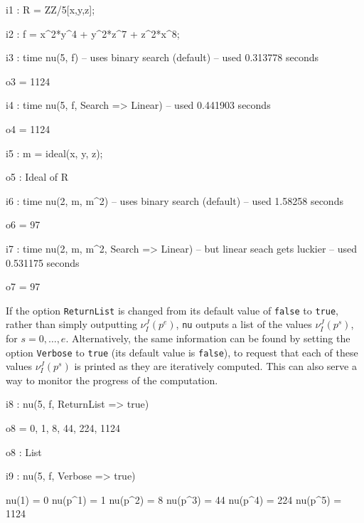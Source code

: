 \documentclass{amsart}
\begin{document}
{\small
{}
\begin{MyVerbatim}

i1 : R = ZZ/5[x,y,z];

i2 : f = x^2*y^4 + y^2*z^7 + z^2*x^8;

i3 : time nu(5, f) -- uses binary search (default)
     -- used 0.313778 seconds

o3 = 1124

i4 : time nu(5, f, Search => Linear)
     -- used 0.441903 seconds

o4 = 1124

i5 : m = ideal(x, y, z);

o5 : Ideal of R

i6 : time nu(2, m, m^2) -- uses binary search (default)
     -- used 1.58258 seconds

o6 = 97

i7 : time nu(2, m, m^2, Search => Linear) -- but linear seach gets luckier
     -- used 0.531175 seconds

o7 = 97
\end{MyVerbatim}
}
\medspace



If the option {\tt ReturnList} is changed from its default value of {\tt false} to {\tt true}, rather than simply outputting $\nu_I^J(p^e)$, {\tt nu} outputs a list of the values $\nu_I^J(p^s)$, for $s=0,\ldots,e$.
Alternatively, the same information can be found by setting the option {\tt Verbose} to {\tt true} (its default value is {\tt false}), to request that each of these values $\nu_I^J(p^s)$ is printed as they are iteratively computed.  This can also serve a way to monitor the progress of the computation.


{\small
{}
\begin{MyVerbatim}

i8 : nu(5, f, ReturnList => true)

o8 = {0, 1, 8, 44, 224, 1124}

o8 : List

i9 : nu(5, f, Verbose => true)

     nu(1) = 0
     nu(p^1) = 1
     nu(p^2) = 8
     nu(p^3) = 44
     nu(p^4) = 224
     nu(p^5) = 1124
\end{MyVerbatim}
}
\medspace
\end{document}

